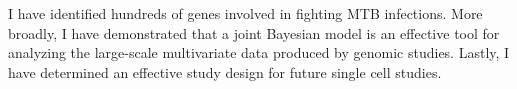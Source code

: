 I have identified hundreds of genes involved in fighting MTB
infections.  More broadly, I have demonstrated that a joint Bayesian
model is an effective tool for analyzing the large-scale multivariate
data produced by genomic studies. Lastly, I have determined an
effective study design for future single cell studies.
